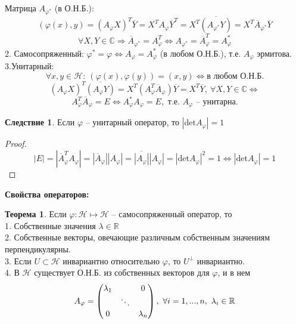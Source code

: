 \documentclass[a4paper, 12pt]{article}
\theoremstyle{definition}
\newtheorem*{theorem}{Теорема}
\newtheorem*{consequense}{Следствие}
\begin{document}
    Матрица $A_{\varphi^*}$ (в О.Н.Б.):
    $$(\varphi(x), y) = (A_{\varphi}X)^T\overline{Y} = 
    X^TA_\varphi\overline{Y}^T = X^T\overline{(A_{\varphi^*}
    Y)} = X^T\overline{A}_{\varphi^*}\overline{Y}$$
    $$\forall X,Y \in \mathbb{C} \Longrightarrow 
    \overline{A}_{\varphi^*} = A_\varphi^T \Longleftrightarrow 
    A_{\varphi^*} = \overline{A}_\varphi^T = A_\varphi^*$$
    2. Самосопряженный: $\varphi^* = \varphi 
    \Longleftrightarrow A_\varphi = A_\varphi^*$ (в любом 
    О.Н.Б.), т.е. $A_\varphi$ эрмитова.\\
    3.Унитарный:
    $$\forall x,y \in \mathcal{H}:\ (\varphi(x), \varphi(y))
    = (x,y) \Longleftrightarrow \text{в любом О.Н.Б.}$$
    $$(A_\varphi X)^T \overline{(A_\varphi Y)} = X^T
    (A_\varphi^T\overline{A}_\varphi)\overline{Y} = X^T
    \overline{Y},\ \forall X,Y \in \mathbb{C} 
    \Longleftrightarrow $$ 
    $$A_\varphi^T\overline{A}_\varphi = E \Longleftrightarrow 
    A_\varphi^* A_\varphi = E,\text{ т.е. } A_\varphi
    \text{ -- унитарна.}$$
    \begin{consequense}
        Если $\varphi$ -- унитарный оператор, то $|\text{det}
        A_\varphi| = 1$
    \end{consequense}
    \begin{proof}
    $$|E| = |\overline{A}_\varphi^T A_\varphi| = |\overline
    {A}_\varphi||A_\varphi| = \overline{|A_\varphi|} |A_\varphi|
    = |\text{det}A_\varphi|^2 = 1 \Longleftrightarrow |\text
    {det}A_\varphi| = 1$$
    \end{proof}
    \textbf{Свойства операторов:}
    \begin{theorem}
        Если $\varphi:\mathcal{H} \longmapsto \mathcal{H}$ --
        самосопряженный оператор, то\\
        1. Собственные значения 
        $\lambda \in \mathbb{R}$\\
        2. Собственные векторы, овечающие различным собственным
        значениям перпендикулярны.\\
        3. Если $U \subset \mathcal{H}$ инвариантно 
        относительно $\varphi$, то $U^\perp$ инвариантно.\\
        4. В $\mathcal{H}$ существует О.Н.Б. из собственных
        векторов для $\varphi$, и в нем 
        $$A_\varphi = \begin{pmatrix}
            \lambda_1 & \null & 0\\
            \null & \ddots & \null\\
            0 & \null & \lambda_n
        \end{pmatrix},\ \forall i = 1,...,n,\ \lambda_i \in 
        \mathbb{R}$$  
    \end{theorem}
\end{document}
